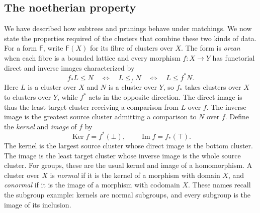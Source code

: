 \documentclass[11pt,a4paper]{article}
\theoremstyle{plain}
\theoremstyle{definition}
\theoremstyle{remark}
\begin{document}
\subsection{The noetherian property}\label{sec:noetherian-property}
We have described how subtrees and prunings behave under matchings.
We now state the properties required of the clusters that combine
these two kinds of data. For a form $\mathsf F$, write
$\mathsf F(X)$ for its fibre of clusters over $X$.
\label{not:cluster-images}
The form is \emph{orean} when each fibre is a bounded lattice
and every morphism $f:X\to Y$ has functorial direct and inverse
images characterized by
\[
 f_*L\le N\quad\Longleftrightarrow\quad L\le_f N
 \quad\Longleftrightarrow\quad L\le f^*N.
\]
Here $L$ is a cluster over $X$ and $N$ is a cluster over
$Y$, so $f_*$ takes clusters over $X$ to clusters over $Y$,
while $f^*$ acts in the opposite direction.
The direct image is thus the least target cluster receiving a
comparison from $L$ over $f$. The inverse image is the greatest
source cluster admitting a comparison to $N$ over $f$.
\label{not:form-kernel-image}
Define the \emph{kernel} and \emph{image} of $f$ by
\[
 \operatorname{Ker}f=f^*(\bot),\qquad
 \operatorname{Im}f=f_*(\top).
\]
The kernel is the largest source cluster whose direct image is
the bottom cluster. The image is the least target cluster whose
inverse image is the whole source cluster. For groups, these are
the usual kernel and image of a homomorphism.
A cluster over $X$ is \emph{normal} if it is the kernel of
a morphism with domain $X$, and \emph{conormal} if it is the
image of a morphism with codomain $X$. These names recall the
subgroup example: kernels are normal subgroups, and every
subgroup is the image of its inclusion.
\end{document}
